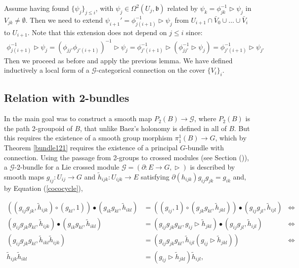 Assume having found $\{\psi_j\}_{j\leq i}$, with $\psi_j\in\Omega^2(U_j,\mathfrak{b})$ related by $\psi_k=\phi_{jk}^{-1}\vartriangleright \psi_j$ in $V_{jk}\neq\emptyset$.
Then we need to extend $\psi_{i+1}'=\phi_{j(i+1)}^{-1}\vartriangleright\psi_{j}$ from $U_{i+1}\cap \bar{V}_{0}\cup\ldots\cup \bar{V}_i$ to $U_{i+1}$. Note that this extension does not depend on $j\leq i$ since:\begin{align*}
\phi_{j(i+1)}^{-1}\vartriangleright\psi_j =(\phi_{jj'}\phi_{j'(i+1)})^{-1}\vartriangleright \psi_j=\phi_{j'(i+1)}^{-1}\vartriangleright (\phi_{jj'}^{-1}\vartriangleright\psi_j)=\phi_{j'(i+1)}^{-1}\vartriangleright\psi_{j'}
\end{align*}
Then we proceed as before and apply the previous lemma. We have defined inductively a local form of a $\mathscr{G}$-categorical connection on the cover $\{V_i\}_i$.


\subsection{Relation with 2-bundles}
In \cite{picken_faria} the main goal was to construct a smooth map $P_2(B)\rightarrow \mathcal{G}$, where $P_2(B)$ is the path 2-groupoid of $B$, that unlike Baez's holonomy is defined in all of $B$. But this requires the existence of a smooth group morphism $\pi_1^1(B)\rightarrow G$, which by Theorem \ref{bundle121} requires the existence of a principal $G$-bundle with connection.
Using the passage from 2-groups to crossed modules (see Section (\label{passage})), a $\mathcal{G}$-2-bundle for a Lie crossed module $\mathcal{G}=(\partial:E\rightarrow G,\vartriangleright)$ is described by smooth maps $g_{ij}:U_{ij}\rightarrow G$ and $\tilde{h}_{ijk}:U_{ijk}\rightarrow E$ satisfying $\partial(h_{ijk})g_{ij}g_{jk}=g_{ik}$ and, by Equation (\ref{cococycle}),

\begin{align*}
  ((g_{ij}g_{jk},\tilde{h}_{ijk})\circ(g_{kl},1))\bullet(g_{ik}g_{kl},\tilde{h}_{ikl}) &=((g_{ij},1)\circ(g_{jk}g_{kl},\tilde{h}_{jkl}))\bullet(g_{ij}g_{jl},\tilde{h}_{ijl}) & \Leftrightarrow \\
 (g_{ij}g_{jk}g_{kl},\tilde{h}_{ijk})\bullet(g_{ik}g_{kl},\tilde{h}_{ikl}) &= (g_{ij}g_{jk}g_{kl},g_{ij}\vartriangleright \tilde{h}_{jkl})\bullet(g_{ij}g_{jl},\tilde{h}_{ijl}) & \Leftrightarrow\\
 (g_{ij}g_{jk}g_{kl},\tilde{h}_{ikl}\tilde{h}_{ijk})& =(g_{ij}g_{jk}g_{kl},\tilde{h}_{ijl}(g_{ij}\vartriangleright \tilde{h}_{jkl})) &\Leftrightarrow \\
\tilde{h}_{ijk}\tilde{h}_{ikl} &=(g_{ij}\vartriangleright \tilde{h}_{jkl})\tilde{h}_{ijl},  
\end{align*}

